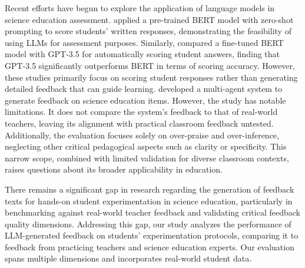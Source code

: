 Recent efforts have begun to explore the application of language models in science education assessment. \citet{wu2023matching} applied a pre-trained BERT model with zero-shot prompting to score students' written responses, demonstrating the feasibility of using LLMs for assessment purposes. Similarly, \citet{latif2024fine} compared a fine-tuned BERT model with GPT-3.5 for automatically scoring student answers, finding that GPT-3.5 significantly outperforms BERT in terms of scoring accuracy. However, these studies primarily focus on scoring student responses rather than generating detailed feedback that can guide learning.
\citet{guo2024using} developed a multi-agent system to generate feedback on science education items. However, the study has notable limitations. It does not compare the system’s feedback to that of real-world teachers, leaving its alignment with practical classroom feedback untested. Additionally, the evaluation focuses solely on over-praise and over-inference, neglecting other critical pedagogical aspects such as clarity or specificity. This narrow scope, combined with limited validation for diverse classroom contexts, raises questions about its broader applicability in education.

There remains a significant gap in research regarding the generation of feedback texts for hands-on student experimentation in science education, particularly in benchmarking against real-world teacher feedback and validating critical feedback quality dimensions. Addressing this gap, our study analyzes the performance of LLM-generated feedback on students' experimentation protocols, comparing it to feedback from practicing teachers and science education experts. Our evaluation spans multiple dimensions and incorporates real-world student data.








